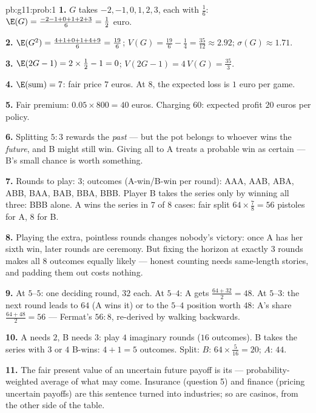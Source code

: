 \begin{solution}{pb:g11:prob:1}
\textbf{1.} $G$ takes $-2, -1, 0, 1, 2, 3$, each with
 $\frac16$: $\E(G) = \frac{-2 - 1 + 0 + 1 + 2 +
3}{6} = \frac12$ euro.

\textbf{2.} $\E(G^2) = \frac{4 + 1 + 0 + 1 + 4 + 9}{6} =
\frac{19}{6}$; $V(G) = \frac{19}{6} - \frac14 = \frac{35}{12}
\approx 2.92$; $\sigma(G) \approx 1.71$.

\textbf{3.} $\E(2G - 1) = 2 \times \frac12 - 1 = 0$;
$V(2G - 1) = 4\,V(G) = \frac{35}{3}$.

\textbf{4.} $\E(\text{sum}) = 7$: fair price $7$ euros. At $8$,
the expected loss is $1$ euro per game.

\textbf{5.} Fair premium: $0.05 \times 800 = 40$ euros.
Charging $60$: expected profit $20$ euros per policy.

\textbf{6.} Splitting $5:3$ rewards the \emph{past} --- but the
pot belongs to whoever wins the \emph{future}, and B might
still win. Giving all to A treats a probable win as certain ---
B's small chance is worth something.

\textbf{7.} Rounds to play: $3$; outcomes (A-win/B-win per
round): AAA, AAB, ABA, ABB, BAA, BAB, BBA, BBB. Player B takes
the series only by winning all three: BBB alone. A wins the
series in $7$ of $8$ cases: fair split
$64 \times \frac78 = 56$ pistoles for A, $8$ for B.

\textbf{8.} Playing the extra, pointless rounds changes
nobody's victory: once A has her sixth win, later rounds are
ceremony. But fixing the horizon at exactly $3$ rounds makes
all $8$ outcomes equally likely --- honest counting needs
same-length stories, and padding them out costs nothing.

\textbf{9.} At $5$--$5$: one deciding round, $32$ each. At
$5$--$4$: A gets $\frac{64 + 32}{2} = 48$. At $5$--$3$: the
next round leads to $64$ (A wins it) or to the $5$--$4$
position worth $48$: A's share $\frac{64 + 48}{2} = 56$ ---
Fermat's $56 : 8$, re-derived by walking backwards.

\textbf{10.} A needs $2$, B needs $3$: play $4$ imaginary
rounds ($16$ outcomes). B takes the series with $3$ or $4$
B-wins: $4 + 1 = 5$ outcomes. Split:
$B$: $64 \times \frac{5}{16} = 20$; $A$: $44$.

\textbf{11.} The fair present value of an uncertain future
payoff is its  --- probability-weighted average of
what may come. Insurance (question 5) and finance (pricing
uncertain payoffs) are this sentence turned into industries;
so are casinos, from the other side of the table.


\end{solution}
